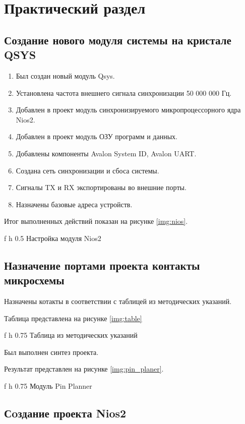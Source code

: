 \chapter{Практический раздел}

\section*{Создание нового модуля системы на кристале QSYS}

\begin{enumerate}
    \item Был создан новый модуль Qsys.
    \item Установлена частота внешнего сигнала синхронизации 50 000 000 Гц.
    \item Добавлен в проект модуль синхронизируемого микропроцессорного ядра Nios2.
    \item Добавлен в проект модуль ОЗУ программ и данных.
    \item Добавлены компоненты Avalon System ID, Avalon UART.
    \item Создана сеть синхронизации и сбоса системы.
    \item Сигналы TX и RX экспортированы во внешние порты.

    \item Назначены базовые адреса устройств.
\end{enumerate}

Итог выполненных действий показан на рисунке \ref{img:nios}.

{f} %
{h} %
{0.5\textwidth}
{Настройка модуля Nios2}


\section*{Назначение портами проекта контакты микросхемы}

Назначены котакты в соответствии с таблицей из методических указаний.

Таблица представлена на рисунке \ref{img:table}

{f} %
{h} %
{0.75\textwidth}
{Таблица из методических указаний}
\clearpage

Был выполнен синтез проекта.

Результат представлен на рисунке \ref{img:pin_planer}.


{f} %
{h} %
{0.75\textwidth}
{Модуль Pin Planner}
\clearpage

\section*{Сoздание проекта Nios2}

